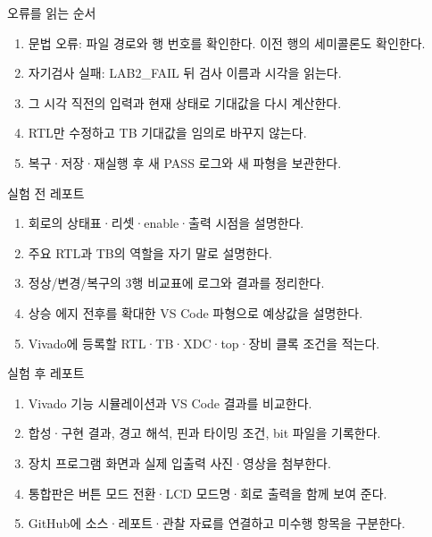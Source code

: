 \begin{frame}{오류를 읽는 순서}
\small
\begin{enumerate}
\item 문법 오류: 파일 경로와 행 번호를 확인한다. 이전 행의 세미콜론도 확인한다.
\item 자기검사 실패: LAB2\_FAIL 뒤 검사 이름과 시각을 읽는다.
\item 그 시각 직전의 입력과 현재 상태로 기대값을 다시 계산한다.
\item RTL만 수정하고 TB 기대값을 임의로 바꾸지 않는다.
\item 복구·저장·재실행 후 새 PASS 로그와 새 파형을 보관한다.
\end{enumerate}
\end{frame}

\begin{frame}[label=reports]{실험 전 레포트}
\small
\begin{enumerate}
\item 회로의 상태표·리셋·enable·출력 시점을 설명한다.
\item 주요 RTL과 TB의 역할을 자기 말로 설명한다.
\item 정상/변경/복구의 3행 비교표에 로그와 결과를 정리한다.
\item 상승 에지 전후를 확대한 VS Code 파형으로 예상값을 설명한다.
\item Vivado에 등록할 RTL·TB·XDC·top·장비 클록 조건을 적는다.
\end{enumerate}
\end{frame}

\begin{frame}{실험 후 레포트}
\small
\begin{enumerate}
\item Vivado 기능 시뮬레이션과 VS Code 결과를 비교한다.
\item 합성·구현 결과, 경고 해석, 핀과 타이밍 조건, bit 파일을 기록한다.
\item 장치 프로그램 화면과 실제 입출력 사진·영상을 첨부한다.
\item 통합판은 버튼 모드 전환·LCD 모드명·회로 출력을 함께 보여 준다.
\item GitHub에 소스·레포트·관찰 자료를 연결하고 미수행 항목을 구분한다.
\end{enumerate}
\end{frame}

